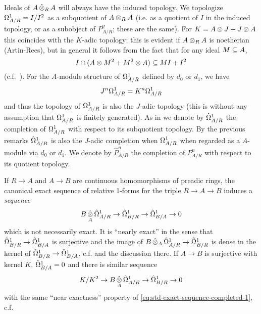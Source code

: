 \documentclass{article}
\theoremstyle{change}
\numberwithin{equation}{subsubsection}
\newcommand\hP{\hat P}
\begin{document}
Ideals of $A\mathop{\hat\otimes}_RA$ will always have the induced topology.  We
topologize $\Omega^1_{A/R}=I/I^2$ as a subquotient of $A\otimes_RA$
(i.e. as a quotient of $I$ in the induced topology, or as a subobject
of $P^2_{A/R}$; these are the same). For $K=A\otimes J+J\otimes A$ this
coincides with the $K$-adic topology; this is evident if $A\otimes_RA$
is noetherian (Artin-Rees), but in general it follows from the fact
that for any ideal $M\subseteq A$,
\begin{displaymath}
  I\cap(A\otimes M^2+M^2\otimes A)\subseteq MI+I^2
\end{displaymath}
(c.f.\ \cite[$0_{IV}$ Prop. 20.4.5]{EGA}). For the $A$-module structure
of $\Omega^1_{A/R}$ defined by $d_0$ or $d_1$, we have
\begin{displaymath}
  J^n\Omega^1_{A/R}=K^n\Omega^1_{A/R}
\end{displaymath}
and thus the topology of $\Omega^1_{A/R}$ is also the $J$-adic topology
(this is without any assumption that $\Omega^1_{A/R}$ is finitely
generated). As in \cite[$0_{IV}$ \S20.7]{EGA} we denote by
$\hat\Omega^1_{A/R}$ the completion of $\Omega^1_{A/R}$ with respect to its
subquotient topology.  By the previous remarks $\hat\Omega^1_{A/R}$ is also
the $J$-adic completion when $\Omega^1_{A/R}$ when regarded as a
$A$-module via $d_0$ or $d_1$. We denote by $\hP^n_{A/R}$ the
completion of $P^n_{A/R}$ with respect to its quotient topology.

If $R\to A$ and $A\to B$ are continuous homomorphisms of preadic rings,
the canonical exact sequence of relative 1-forms for the triple
$R\to A\to B$ induces a \textit{sequence}
\begin{equation}
  \label{eq:std-exact-sequence-completed-1}
  B\mathop{\hat\otimes}_A\hat\Omega^1_{A/R}\to\hat\Omega^1_{B/R}\to\hat\Omega^1_{B/A}\to 0
\end{equation}
which is not necessarily exact. It is ``nearly exact'' in the sense
that $\hat\Omega^1_{B/R}\to\hat\Omega^1_{B/A}$ is surjective and the image of
$B\mathop{\hat\otimes}_A\hat\Omega^1_{A/R}\to\hat\Omega^1_{B/R}$ is dense in the kernel of
$\hat\Omega^1_{B/R}\to\hat\Omega^1_{B/A}$, c.f. \cite[$0_{IV}$ 20.7.17.3]{EGA} and
the discussion there. If $A\to B$ is surjective with kernel $K$,
$\hat\Omega^1_{B/A}=0$ and there is similar sequence
\begin{equation}
  \label{eq:std-exact-sequence-completed-2}
  K/K^2\to B\mathop{\hat\otimes}_A\hat\Omega^1_{A/R}\to\hat\Omega^1_{B/R}\to 0
\end{equation}
with the same ``near exactness'' property of
\ref{eq:std-exact-sequence-completed-1}, c.f. \cite[$0_{IV}$ 20.7.20]{EGA}
\end{document}
